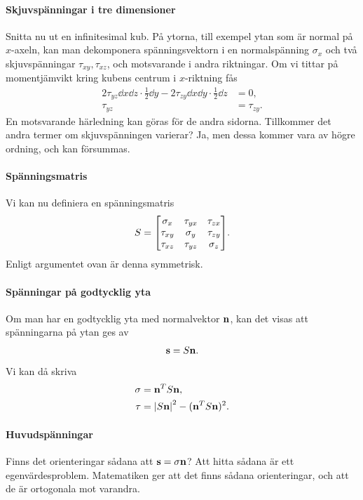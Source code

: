 \paragraph{Skjuvspänningar i tre dimensioner}
Snitta nu ut en infinitesimal kub. På ytorna, till exempel ytan som är normal på $x$-axeln, kan man dekomponera spänningsvektorn i en normalspänning $\sigma_{x}$ och två skjuvspänningar $\tau_{xy}, \tau_{xz}$, och motsvarande i andra riktningar. Om vi tittar på momentjämvikt kring kubens centrum i $x$-riktning fås
\begin{align*}
	2\tau_{yz}\dd{x}\dd{z}\cdot\frac{1}{2}\dd{y} - 2\tau_{zy}\dd{x}\dd{y}\cdot\frac{1}{2}\dd{z}        &= 0, \\
	\tau_{yz} &= \tau_{zy}.
\end{align*}
En motsvarande härledning kan göras för de andra sidorna. Tillkommer det andra termer om skjuvspänningen varierar? Ja, men dessa kommer vara av högre ordning, och kan försummas.

\paragraph{Spänningsmatris}
Vi kan nu definiera en spänningsmatris
\begin{align*}
	S =
	\mqty[
		\sigma_{x} & \tau_{yx}  & \tau_{zx} \\
		\tau_{xy}  & \sigma_{y} & \tau_{zy} \\
		\tau_{xz}  & \tau_{yz}  & \sigma_{z}
	].
\end{align*}
Enligt argumentet ovan är denna symmetrisk.

\paragraph{Spänningar på godtycklig yta}
Om man har en godtycklig yta med normalvektor $\vb{n}$, kan det visas att spänningarna på ytan ges av
\begin{align*}
	\vb{s} = S\vb{n}.
\end{align*}
Vi kan då skriva
\begin{align*}
	\sigma &= \vb{n}^{T}S\vb{n}, \\
	\tau   &= \abs{S\vb{n}}^{2} - (\vb{n}^{T}S\vb{n})^{2}.
\end{align*}

\paragraph{Huvudspänningar}
Finns det orienteringar sådana att $\vb{s} = \sigma\vb{n}$? Att hitta sådana är ett egenvärdesproblem. Matematiken ger att det finns sådana orienteringar, och att de är ortogonala mot varandra.

